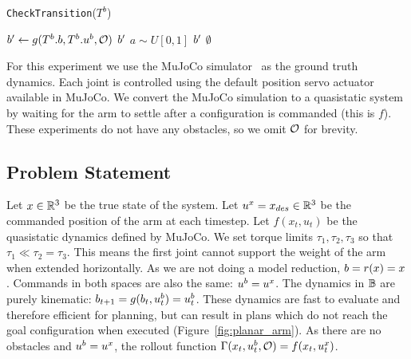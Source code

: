 \begin{algorithm}[h]
\caption{\strut \texttt{CheckTransition}($T^b$)}%
\begin{algorithmic}[1]
    \algtext*{EndIf}
    \State $b' \gets g(T^b.b,  T^b.u^b, \mathcal{O})$
    \If {\texttt{Classify}$(T^\reducedstate) ==$ \texttt{Reliable}}
        \State \Return $b'$
    \EndIf
    \State $a \sim U[0, 1]$
    \If {$a < e^{-k p_{\text{acc}}}$}
        \State \Return $b'$
    \EndIf
    \State \Return \texttt{$\emptyset$}
\end{algorithmic}
\label{alg:checktransition}
\end{algorithm}

For this experiment we use the MuJoCo simulator~\cite{mujoco} as the ground truth dynamics. Each joint is controlled using the default position servo actuator available in MuJoCo. We convert the MuJoCo simulation to a quasistatic system by waiting for the arm to settle after a configuration is commanded (this is $f$). These experiments do not have any obstacles, so we omit $\mathcal{O}$ for brevity.


\subsection{Problem Statement}

Let $x \in \mathbb{R}^3$ be the true state of the system. Let $u^x = x_{des} \in \mathbb{R}^3$ be the commanded position of the arm at each timestep. Let $f(x_t, u_t)$ be the quasistatic dynamics defined by MuJoCo. We set torque limits $\tau_1, \tau_2, \tau_3$ so that $\tau_1 \ll \tau_2 = \tau_3$. This means the first joint cannot support the weight of the arm when extended horizontally. As we are not doing a model reduction, $b = r(x) = x$. Commands in both spaces are also the same: $u^b = u^x$. The dynamics in $\mathbb{B}$ are purely kinematic: $b_{t+1} = g(b_t, u^b_t) = u^b_t$. These dynamics are fast to evaluate and therefore efficient for planning, but can result in plans which do not reach the goal configuration when executed (Figure~\ref{fig:planar_arm}). As there are no obstacles and $u^b = u^x$, the rollout function $\Gamma(x_t, u^b_t, \mathcal{O}) = f(x_t, u_t^x)$.

